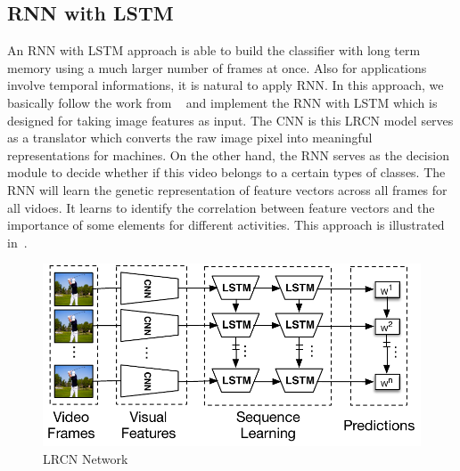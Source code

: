 

\subsection{RNN with LSTM}
An RNN with LSTM approach is able to build the classifier with long term memory using a much larger number of frames at once. 
Also for applications involve temporal informations, it is natural to apply RNN. In this approach, we basically follow the work from ~\cite{ltrcn} and implement the RNN with LSTM which is designed for taking image features as input. The CNN is this LRCN model serves as a translator which converts the raw image pixel into meaningful representations for machines. On the other hand, the RNN serves as the decision module to decide whether if this video belongs to a certain types of classes. The RNN will learn the genetic representation of feature vectors across all frames for all vidoes. It learns to identify the correlation between feature vectors and the importance of some elements for different activities. 
This approach is illustrated in~.
\begin{figure}
  \centering
  \includegraphics[width=1.0\linewidth]{figs/lcrn}
  \caption{LRCN Network}
  \label{fig:lcrn}
\end{figure}

